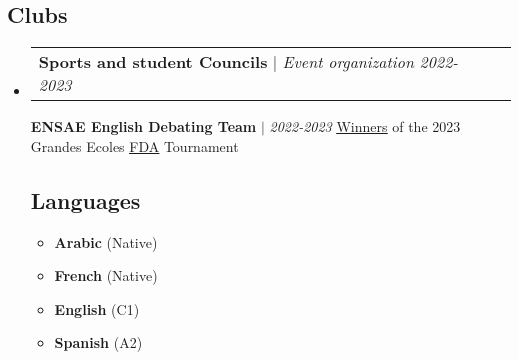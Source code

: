 \documentclass[letterpaper,11pt]{article}
\makeatletter
\newcommand{\resumeItem}[1]{
  \item\small{
    {#1 \vspace{-2pt}}
  }
}
\newcommand{\resumeProjectHeading}[2]{
    \item
    \begin{tabular*}{0.97\textwidth}{l@{\extracolsep{\fill}}r}
      \small#1 & #2 \\
    \end{tabular*}\vspace{-7pt}
}
\newcommand{\resumeSubHeadingListStart}{\begin{itemize}[leftmargin=0.15in, label={}]}
\newcommand{\resumeSubHeadingListEnd}{\end{itemize}}
\newcommand{\resumeItemListStart}{\begin{itemize}}
\newcommand{\resumeItemListEnd}{\end{itemize}\vspace{-5pt}}
\makeatother
\begin{document}
\vspace{-10pt}
    \begin{multicols}{2}
    \section*{\faSlideshare\hspace{2pt}Clubs}
    \resumeSubHeadingListStart%
        
        \resumeProjectHeading%
          {\textbf{Sports and student Councils} $|$ \footnotesize\emph{Event organization 2022-2023}\vspace{8pt}}{}

        \textbf{ENSAE English Debating Team}  $|$ \footnotesize\emph{2022-2023}
        \newline
        \href{https://www.linkedin.com/feed/update/urn:li:activity:7050135401461669888?updateEntityUrn=urn%3Ali%3Afs_feedUpdate%3A%28V2%2Curn%3Ali%3Aactivity%3A7050135401461669888%29}{\underline{Winners}} {of the 2023 Grandes Ecoles \href{https://www.frenchdebatingassociation.fr/#fda}{\underline{FDA}} Tournament }
        \vspace{6pt}
        
        
        
    \columnbreak%
    

    
    \vspace{-10pt}
    \section*{\faLanguage\hspace{2pt}Languages}
    \resumeItemListStart{}
    \resumeItem{\textbf {Arabic} (Native)}
    \resumeItem{\textbf {French} (Native)}
    \resumeItem{\textbf {English} (C1)}
    \resumeItem{\textbf {Spanish} (A2)}
    \resumeItemListEnd{}
        
          
    \resumeSubHeadingListEnd%
    \end{multicols}
\end{document}
